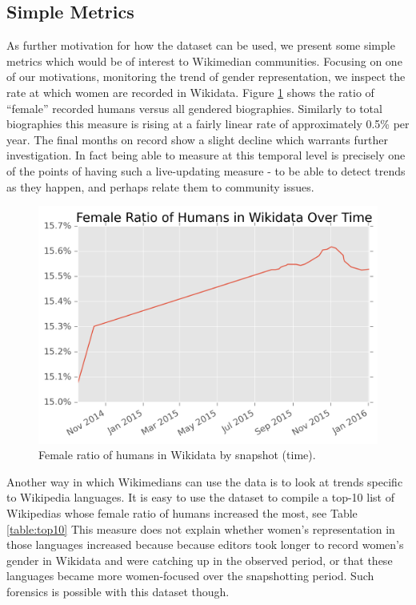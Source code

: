 \documentclass[letterpaper]{article}
\begin{document}
\subsection{Simple Metrics}
As further motivation for how the dataset can be used, we present some simple metrics which would be of interest to Wikimedian communities. Focusing on one of our motivations, monitoring the trend of gender representation, we inspect the rate at which women are recorded in Wikidata. Figure \ref{fig:frb} shows the ratio of ``female'' recorded humans versus all gendered biographies. Similarly to total biographies this measure is rising at a fairly linear rate of approximately 0.5\% per year. The final months on record show a slight decline which warrants further investigation. In fact being able to measure at this temporal level is precisely one of the points of having such a live-updating measure - to be able to detect trends as they happen, and perhaps relate them to community issues. 

\begin{figure}
\includegraphics[scale=0.6]{figures/frbwikidata.png} 
\caption{Female ratio of humans in Wikidata by snapshot (time).}
\label{fig:frb}
\end{figure}

Another way in which Wikimedians can use the data is to look at trends specific to Wikipedia languages. It is easy to use the dataset to compile a top-10 list of Wikipedias whose female ratio of humans increased the most, see Table \ref{table:top10} This measure does not explain whether women's representation in those languages increased because because editors took longer to record women's gender in Wikidata and were catching up in the observed period, or that these languages became more women-focused over the snapshotting period. Such forensics is possible with this dataset though.
\end{document}
